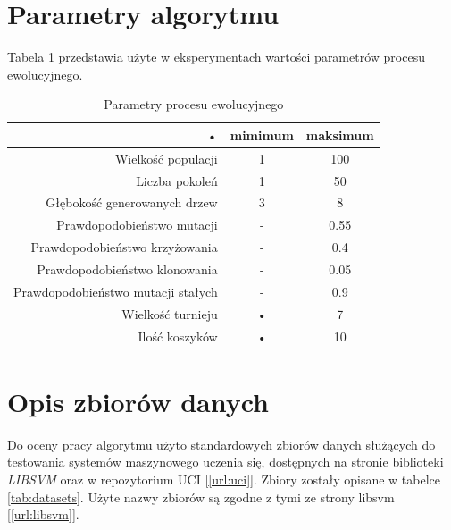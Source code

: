 \section{Parametry algorytmu}
Tabela \ref{tab:params-gp} przedstawia użyte w eksperymentach wartości parametrów procesu ewolucyjnego.
\begin{table}
	\caption{Parametry procesu ewolucyjnego \label{tab:params-gp}}
	\begin{tabular}{|r||c|c|}
	\hline
	• & mimimum & maksimum \\ 
	\hline \hline 
	Wielkość populacji & 1 & 100 \\ 
	\hline
	Liczba pokoleń & 1 & 50 \\ 
	\hline 
	Głębokość generowanych drzew & 3 & 8 \\ 
	\hline 
	Prawdopodobieństwo mutacji & - & 0.55 \\ 
	\hline 
	Prawdopodobieństwo krzyżowania & - & 0.4 \\ 
	\hline 
	Prawdopodobieństwo klonowania & - & 0.05 \\ 
	\hline 
	Prawdopodobieństwo mutacji stałych & - & 0.9 \\ 
	\hline 
	Wielkość turnieju & • & 7 \\ 
	\hline 
	Ilość koszyków  & • & 10 \\ 
	\hline 
	\end{tabular} 
\end{table}
	
\section{Opis zbiorów danych}
	Do oceny pracy algorytmu użyto standardowych zbiorów danych służących do testowania systemów maszynowego uczenia się, dostępnych na stronie biblioteki \emph{LIBSVM} \cite{chang_libsvm:_2011}  oraz w repozytorium UCI \cite{Bache+Lichman:2013} [\ref{url:uci}]. Zbiory zostały opisane w tabelce \ref{tab:datasets}. Użyte nazwy zbiorów są zgodne z tymi ze strony libsvm [\ref{url:libsvm}].


